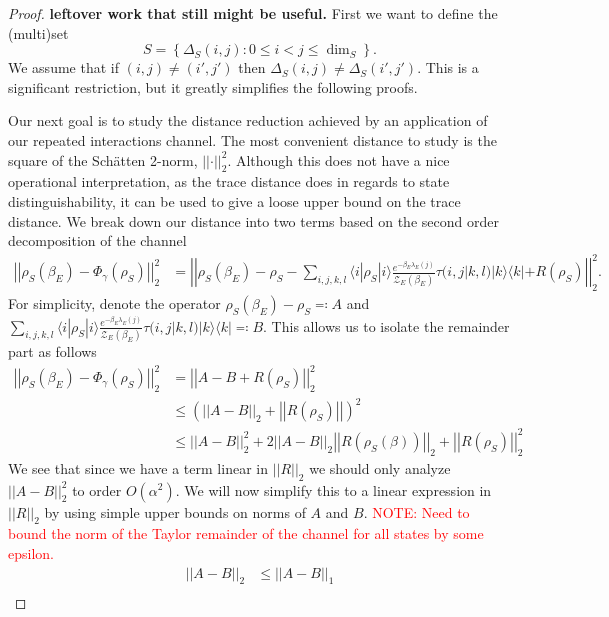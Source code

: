 \documentclass{article}
\newcommand{\ket}[1]{|#1\rangle}
\newcommand{\bra}[1]{\langle #1|}
\newcommand{\ketbra}[2]{| #1\rangle\! \langle #2|}
\newcommand{\parens}[1]{\left( #1 \right)}
\newcommand{\norm}[1]{\left| \left| #1 \right| \right|}
\newcommand{\set}[1]{\left\{ #1 \right\}}
\newcommand{\bigo}[1]{O\left( #1 \right)}
\newcommand{\partfun}{\mathcal{Z}}
\begin{document}
\begin{proof}
\textbf{leftover work that still might be useful.}
    First we want to define the (multi)set
    \begin{equation}
        S = \set{\Delta_S(i,j) : 0 \leq i < j \leq \dim_S}.
    \end{equation}
    We assume that if $(i,j) \neq (i', j')$ then $\Delta_S(i,j) \neq \Delta_S(i', j')$. This is a significant restriction, but it greatly simplifies the following proofs. 
    
    Our next goal is to study the distance reduction achieved by an application of our repeated interactions channel. The most convenient distance to study is the square of the Sch\"{a}tten 2-norm, $\norm{\cdot}_2^2$. Although this does not have a nice operational interpretation, as the trace distance does in regards to state distinguishability, it can be used to give a loose upper bound on the trace distance. We break down our distance into two terms based on the second order decomposition of the channel
\begin{align}
    \norm{\rho_S(\beta_E) - \Phi_{\gamma}(\rho_S)}_2^2 &= \norm{\rho_S(\beta_E) - \rho_S - \sum_{i, j, k, l} \bra{i} \rho_S \ket{i} \frac{e^{-\beta_E \lambda_E(j)}}{\partfun_E(\beta_E)}   \tau(i, j| k,l) \ketbra{k}{k} + R(\rho_S)}_2^2.
\end{align}
For simplicity, denote the operator $\rho_S(\beta_E) - \rho_S \eqqcolon A$ and $\sum_{i, j, k, l} \bra{i} \rho_S \ket{i} \frac{e^{-\beta_E \lambda_E(j)}}{\partfun_E(\beta_E)} \tau(i, j| k,l) \ketbra{k}{k} \eqqcolon B$. This allows us to isolate the remainder part as follows
\begin{align}
    \norm{\rho_S(\beta_E) - \Phi_\gamma(\rho_S)}_2^2 &= \norm{A - B + R(\rho_S)}_2^2 \\
    &\leq \parens{\norm{A - B}_2 + \norm{R(\rho_S)}}^2 \\
    &\leq \norm{A - B}_2^2 + 2 \norm{A - B}_2 \norm{R(\rho_S(\beta))}_2 + \norm{R(\rho_S)}_2^2
\end{align}
We see that since we have a term linear in $\norm{R}_2$ we should only analyze $\norm{A - B}_2^2$ to order $\bigo{\alpha^2}$. We will now simplify this to a linear expression in $\norm{R}_2$ by using simple upper bounds on norms of $A$ and $B$. \textcolor{red}{NOTE: Need to bound the norm of the Taylor remainder of the channel for all states by some epsilon.} 
\begin{align}
    \norm{A - B}_2 &\leq \norm{A - B}_1 \\

\end{align}
\end{proof}
\end{document}
